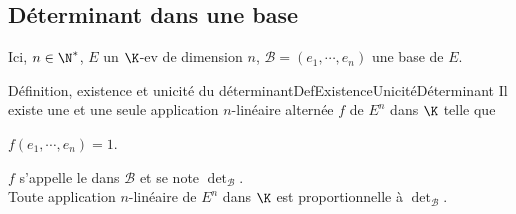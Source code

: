 \documentclass[12pt,a4paper]{report}
\begin{document}
\subsection{Déterminant dans une base}

Ici, $n \in \N^*$, $E$ un $\K$-ev de dimension $n$, $\mathcal{B} = (e_1,\cdots,e_n)$ une base de $E$.

\begin{theoreme}{Définition, existence et unicité du déterminant}{DefExistenceUnicitéDéterminant}
Il existe une et une seule application $n$-linéaire alternée $f$ de $E^n$ dans $\K$ telle que 
\begin{center}
$f(e_1,\cdots,e_n) = 1$.
\end{center}
$f$ s'appelle le  dans $\mathcal{B}$ et se note $\det_{\mathcal{B}}$. \\
Toute application $n$-linéaire de $E^n$ dans $\K$ est proportionnelle à $\det_{\mathcal{B}}$.
\end{theoreme}
\end{document}
